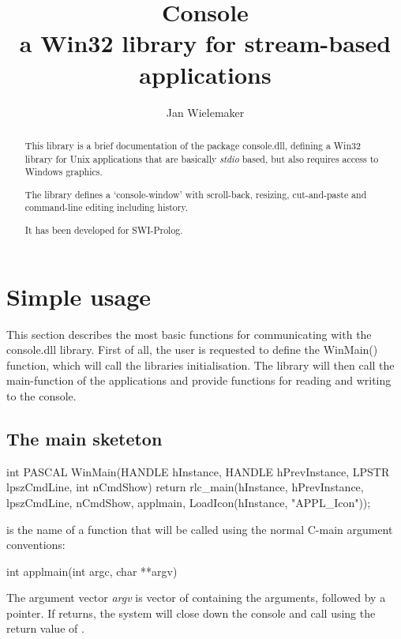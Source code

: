 \documentclass[11pt]{article}
\begin{document}
\title{\Huge Console\\[5pt]
       \Large a Win32 library for stream-based applications}
\author{Jan Wielemaker}

\maketitle

\begin{abstract}
This library is a brief documentation of the package console.dll,
defining a Win32 library for Unix applications that are basically
{\em stdio} based, but also requires access to Windows graphics.

The library defines a `console-window' with scroll-back, resizing,
cut-and-paste and command-line editing including history.

It has been developed for SWI-Prolog.
\end{abstract}

       
\section{Simple usage}

This section describes the most basic functions for communicating with
the console.dll library.  First of all, the user is requested to define
the WinMain() function, which will call the libraries initialisation.
The library will then call the main-function of the applications and
provide functions for reading and writing to the console.

\subsection{The main sketeton}

\begin{code}
int PASCAL
WinMain(HANDLE hInstance, HANDLE hPrevInstance,
	LPSTR lpszCmdLine, int nCmdShow)
{ return rlc_main(hInstance, hPrevInstance, lpszCmdLine, nCmdShow,
		  applmain, LoadIcon(hInstance, "APPL_Icon"));
}
\end{code}

 is the name of a function that will be called using
the normal C-main argument conventions:

\begin{code}
int
applmain(int argc, char **argv)
{
}
\end{code}

The argument vector {\em argv} is vector of  containing the
arguments, followed by a  pointer. If 
returns, the system will close down the console and call 
using the return value of .
\end{document}
